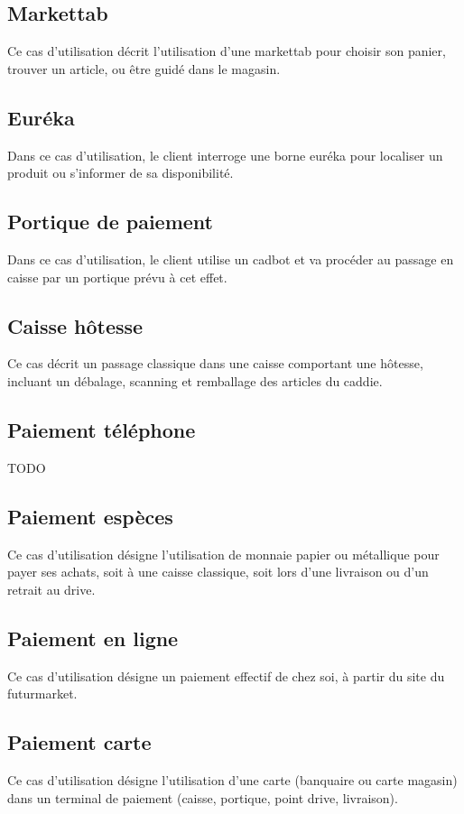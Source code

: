 \subsection{Markettab}
Ce cas d'utilisation décrit l'utilisation d'une markettab pour choisir son panier, trouver un article, ou être guidé dans le magasin.

\subsection{Euréka}
Dans ce cas d'utilisation, le client interroge une borne euréka pour localiser un produit ou s'informer de sa disponibilité.

\subsection{Portique de paiement}
Dans ce cas d'utilisation, le client utilise un cadbot et va procéder au passage en caisse par un portique prévu à cet effet. 

\subsection{Caisse hôtesse}
Ce cas décrit un passage classique dans une caisse comportant une hôtesse, incluant un débalage, scanning et remballage des articles du caddie.

\subsection{Paiement téléphone}
TODO

\subsection{Paiement espèces}
Ce cas d'utilisation désigne l'utilisation de monnaie papier ou métallique pour payer ses achats, soit à une caisse classique, soit lors d'une livraison ou d'un retrait au drive.

\subsection{Paiement en ligne}
Ce cas d'utilisation désigne un paiement effectif de chez soi, à partir du site du futurmarket.

\subsection{Paiement carte}
Ce cas d'utilisation désigne l'utilisation d'une carte (banquaire ou carte magasin) dans un terminal de paiement (caisse, portique, point drive, livraison).

